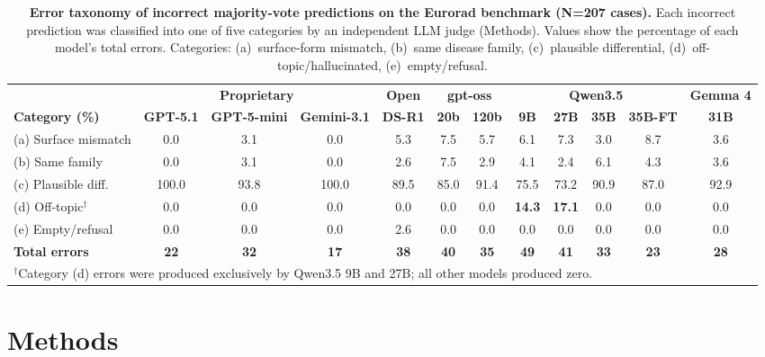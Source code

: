 \documentclass[10pt,journal,compsoc, onecolumn]{IEEEtran}
\begin{document}
\begin{table}[!htbp]
\centering
\scriptsize
\setlength{\tabcolsep}{3pt}
\caption{\textbf{Error taxonomy of incorrect majority-vote predictions on the Eurorad benchmark (N=207 cases).}
Each incorrect prediction was classified into one of five categories by an independent LLM judge (Methods). Values show the percentage of each model's total errors. Categories: (a)~surface-form mismatch, (b)~same disease family, (c)~plausible differential, (d)~off-topic/hallucinated, (e)~empty/refusal.}
\label{tab:error_taxonomy}
\begin{tabular}{l ccc @{\hskip 6pt} c @{\hskip 6pt} cc @{\hskip 6pt} cccc @{\hskip 6pt} c}
\toprule
& \multicolumn{3}{c}{\textbf{Proprietary}} & \textbf{Open} & \multicolumn{2}{c}{\textbf{gpt-oss}} & \multicolumn{4}{c}{\textbf{Qwen3.5}} & \textbf{Gemma 4} \\
\cmidrule(lr){2-4} \cmidrule(lr){5-5} \cmidrule(lr){6-7} \cmidrule(lr){8-11} \cmidrule(lr){12-12}
\textbf{Category (\%)} &
\textbf{GPT-5.1} & \textbf{GPT-5-mini} & \textbf{Gemini-3.1} & \textbf{DS-R1} &
\textbf{20b} & \textbf{120b} &
\textbf{9B} & \textbf{27B} & \textbf{35B} & \textbf{35B-FT} & \textbf{31B} \\
\midrule
(a) Surface mismatch  & 0.0  & 3.1  & 0.0   & 5.3  & 7.5  & 5.7  & 6.1  & 7.3  & 3.0  & 8.7  & 3.6 \\
(b) Same family       & 0.0  & 3.1  & 0.0   & 2.6  & 7.5  & 2.9  & 4.1  & 2.4  & 6.1  & 4.3  & 3.6 \\
(c) Plausible diff.   & 100.0 & 93.8 & 100.0 & 89.5 & 85.0 & 91.4 & 75.5 & 73.2 & 90.9 & 87.0 & 92.9 \\
(d) Off-topic$^\dagger$ & 0.0  & 0.0  & 0.0   & 0.0  & 0.0  & 0.0  & \textbf{14.3} & \textbf{17.1} & 0.0  & 0.0  & 0.0 \\
(e) Empty/refusal     & 0.0  & 0.0  & 0.0   & 2.6  & 0.0  & 0.0  & 0.0  & 0.0  & 0.0  & 0.0  & 0.0 \\
\midrule
\textbf{Total errors} & \textbf{22} & \textbf{32} & \textbf{17} & \textbf{38} & \textbf{40} & \textbf{35} & \textbf{49} & \textbf{41} & \textbf{33} & \textbf{23} & \textbf{28} \\
\bottomrule
\multicolumn{12}{l}{\footnotesize $^\dagger$Category (d) errors were produced exclusively by Qwen3.5 9B and 27B; all other models produced zero.}
\end{tabular}
\end{table}


\section*{Methods}
\end{document}

